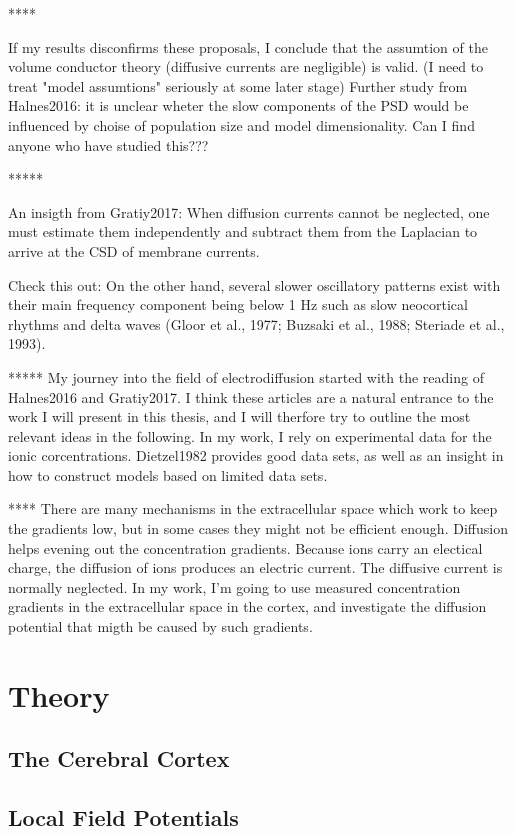 \documentclass{article}
\begin{document}
****



If my results disconfirms these proposals, I conclude that the assumtion of the volume conductor theory (diffusive currents are negligible) is valid. 
(I need to treat "model assumtions" seriously at some later stage)
Further study from Halnes2016: it is unclear wheter the slow components of the PSD would be influenced by choise of population size and model dimensionality. Can I find anyone who have studied this???




*****


An insigth from Gratiy2017: When diffusion currents cannot be
neglected, one must estimate them independently and
subtract them from the Laplacian to arrive at the CSD of membrane
currents.

Check this out: On the
other hand, several slower oscillatory patterns exist with their main
frequency component being below 1 Hz such as slow neocortical
rhythms and delta waves (Gloor et al., 1977; Buzsaki et al., 1988;
Steriade et al., 1993).


*****
My journey into the field of electrodiffusion started with the reading of Halnes2016 and Gratiy2017. I think these articles are a natural entrance to the work I will present in this thesis, and I will therfore try to outline the most relevant ideas in the following. In my work, I rely on experimental data for the ionic corcentrations. Dietzel1982 provides good data sets, as well as an insight in how to construct models based on limited data sets. 


****
There are many mechanisms in the extracellular space which work to keep the gradients low, but in some cases they might not be efficient enough. Diffusion helps evening out the concentration gradients. Because ions carry an electical charge, the diffusion of ions produces an electric current. The diffusive current is normally neglected. In my work, I'm going to use measured concentration gradients in the extracellular space in the cortex, and investigate the diffusion potential that migth be caused by such gradients.
\section{Theory}

\subsection{The Cerebral Cortex}
\subsection{Local Field Potentials}
\end{document}
